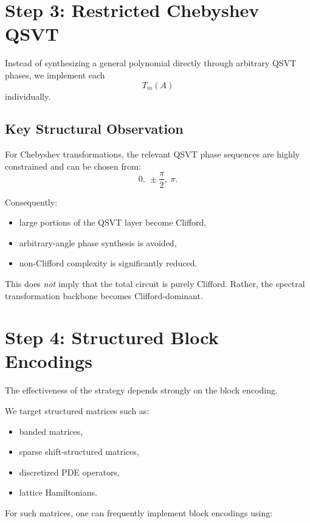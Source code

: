 \documentclass[12pt,a4paper]{article}
\begin{document}
\section{Step 3: Restricted Chebyshev QSVT}

Instead of synthesizing a general polynomial directly through arbitrary QSVT phases, we implement each
\[
T_m(A)
\]
individually.

\subsection{Key Structural Observation}

For Chebyshev transformations, the relevant QSVT phase sequences are highly constrained and can be chosen from:
\[
0,\ \pm\frac{\pi}{2},\ \pi.
\]

Consequently:

\begin{itemize}
    \item large portions of the QSVT layer become Clifford,
    \item arbitrary-angle phase synthesis is avoided,
    \item non-Clifford complexity is significantly reduced.
\end{itemize}

This does \emph{not} imply that the total circuit is purely Clifford. Rather, the spectral transformation backbone becomes Clifford-dominant.


\section{Step 4: Structured Block Encodings}

The effectiveness of the strategy depends strongly on the block encoding.

We target structured matrices such as:

\begin{itemize}
    \item banded matrices,
    \item sparse shift-structured matrices,
    \item discretized PDE operators,
    \item lattice Hamiltonians.
\end{itemize}

For such matrices, one can frequently implement block encodings using:
\end{document}
